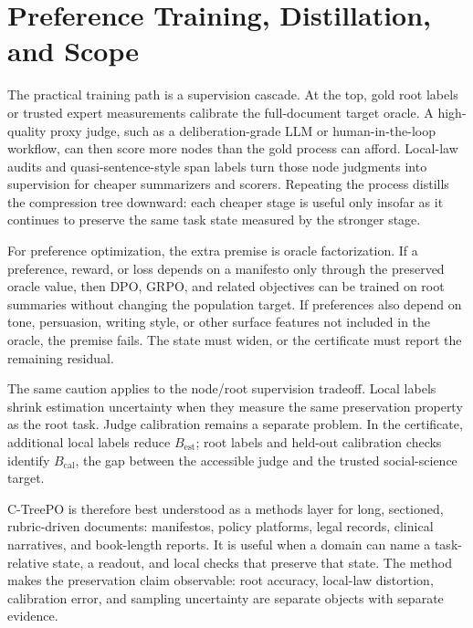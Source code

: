 \section{Preference Training, Distillation, and Scope}\label{sec:min-applications}

The practical training path is a supervision cascade. At the top, gold root
labels or trusted expert measurements calibrate the full-document target
oracle. A high-quality proxy judge, such as a deliberation-grade LLM or
human-in-the-loop workflow, can then score more nodes than the gold process can
afford. Local-law audits and quasi-sentence-style span labels turn those node
judgments into supervision for cheaper summarizers and scorers. Repeating the
process distills the compression tree downward: each cheaper stage is useful
only insofar as it continues to preserve the same task state measured by the
stronger stage.

For preference optimization, the extra premise is oracle factorization. If a
preference, reward, or loss depends on a manifesto only through the preserved
oracle value, then DPO, GRPO, and related objectives can be trained on root
summaries without changing the population target. If preferences also depend
on tone, persuasion, writing style, or other surface features not included in
the oracle, the premise fails. The state must widen, or the certificate must
report the remaining residual.

The same caution applies to the node/root supervision tradeoff. Local labels
shrink estimation uncertainty when they measure the same preservation property
as the root task. Judge calibration remains a separate problem. In the
certificate, additional local labels reduce $B_{\mathrm{est}}$; root labels
and held-out calibration checks identify $B_{\mathrm{cal}}$, the gap between
the accessible judge and the trusted social-science target.

C-TreePO is therefore best understood as a methods layer for long, sectioned,
rubric-driven documents: manifestos, policy platforms, legal records,
clinical narratives, and book-length reports. It is useful when a domain can
name a task-relative state, a readout, and local checks that preserve that
state. The method makes the preservation claim observable: root accuracy,
local-law distortion, calibration error, and sampling uncertainty are separate
objects with separate evidence.
